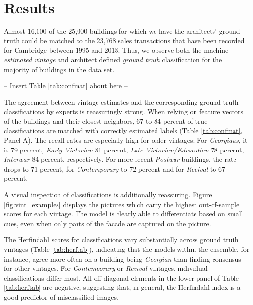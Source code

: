 \documentclass[]{article}
\begin{document}
\hypertarget{results}{%
\section{Results}\label{results}}

Almost 16,000 of the 25,000 buildings for which we have the architects'
ground truth could be matched to the 23,768 sales transactions that have
been recorded for Cambridge between 1995 and 2018. Thus, we observe both
the machine \emph{estimated vintage} and architect defined \emph{ground
truth} classification for the majority of buildings in the data set.

\begin{center}
  -- Insert Table \ref{tab:confmat} about here --
\end{center}

The agreement between vintage estimates and the corresponding ground
truth classifications by experts is reassuringly strong. When relying on
feature vectors of the buildings and their closest neighbors, 67 to 84
percent of true classifications are matched with correctly estimated
labels (Table \ref{tab:confmat}, Panel A). The recall rates are
especially high for older vintages: For \emph{Georgians}, it is 79
percent, \emph{Early Victorian} 81 percent, \emph{Late
Victorian/Edwardian} 78 percent, \emph{Interwar} 84 percent,
respectively. For more recent \emph{Postwar} buildings, the rate drops
to 71 percent, for \emph{Contemporary} to 72 percent and for
\emph{Revival} to 67 percent.

A visual inspection of classifications is additionally reassuring.
Figure \ref{fig:vint_examples} displays the pictures which carry the
highest out-of-sample scores for each vintage. The model is clearly able
to differentiate based on small cues, even when only parts of the facade
are captured on the picture.

The Herfindahl scores for classifications vary substantially across
ground truth vintages (Table \ref{tab:herftab}), indicating that the
models within the ensemble, for instance, agree more often on a building
being \emph{Georgian} than finding consensus for other vintages. For
\emph{Contemporary} or \emph{Revival} vintages, individual
classifications differ most. All off-diagonal elements in the lower
panel of Table \ref{tab:herftab} are negative, suggesting that, in
general, the Herfindahl index is a good predictor of misclassified
images.
\end{document}
